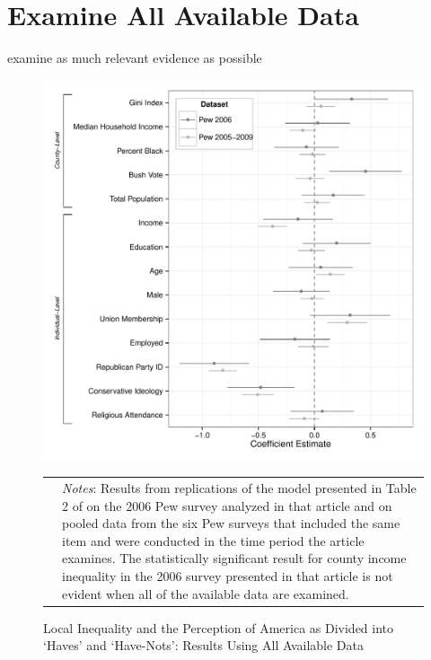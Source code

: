 
\section{Examine All Available Data}

examine as much relevant evidence as possible

\begin{figure}[htbp] 
  \caption{Local Inequality and the Perception of America as Divided into `Haves' and `Have-Nots': Results Using All Available Data}
  \label{F:coef.t1m1}
  \begin{center}
    \includegraphics[width=5.25in]{../figures/03_examine_all_available_data_t2.pdf}
  \end{center}
  \begin{footnotesize}
  \begin{tabular}{p{.1in} p{5.1in}}
  & \emph{Notes}: Results from replications of the model presented in Table 2 of \citet{Newman2015} on the 2006 Pew survey analyzed in that article and on pooled data from the six Pew surveys that included the same item and were conducted in the time period the article examines.  The statistically significant result for county income inequality in the 2006 survey presented in that article is not evident when all of the available data are examined.
  \end{tabular}
  \end{footnotesize}
\end{figure}

